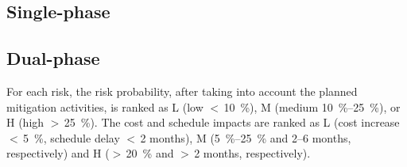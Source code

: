 \subsection{Single-phase}
\label{sec:tc-risks-sp}





 
 
 

\subsection{Dual-phase}
\label{sec:tc-risks-dp}

For each risk, the risk probability, after taking into account the planned mitigation activities, is ranked as 
L (low $<\,$\SI{10}{\%}), 
M (medium \SIrange{10}{25}{\%}), or 
H (high $>\,$\SI{25}{\%}). 
The cost and schedule impacts are ranked as 
L (cost increase $<\,$\SI{5}{\%}, schedule delay $<\,$\num{2} months), 
M (\SIrange{5}{25}{\%} and 2--6 months, respectively) and 
H ($>\,$\SI{20}{\%} and $>\,$2 months, respectively).









